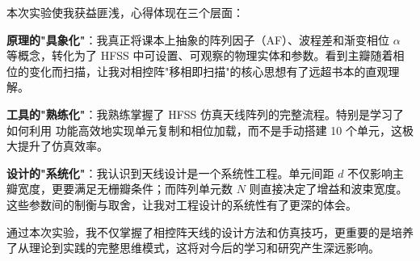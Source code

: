 \documentclass[12pt,a4paper,UTF8]{article}
\begin{document}
本次实验使我获益匪浅，心得体现在三个层面：

\textbf{原理的"具象化"}：我真正将课本上抽象的阵列因子（AF）、波程差和渐变相位 $\alpha$ 等概念，转化为了 HFSS 中可设置、可观察的物理实体和参数。看到主瓣随着相位的变化而扫描，让我对相控阵"移相即扫描"的核心思想有了远超书本的直观理解。

\textbf{工具的"熟练化"}：我熟练掌握了 HFSS 仿真天线阵列的完整流程。特别是学习了如何利用  功能高效地实现单元复制和相位加载，而不是手动搭建 10 个单元，这极大提升了仿真效率。

\textbf{设计的"系统化"}：我认识到天线设计是一个系统性工程。单元间距 $d$ 不仅影响主瓣宽度，更要满足无栅瓣条件；而阵列单元数 $N$ 则直接决定了增益和波束宽度。这些参数间的制衡与取舍，让我对工程设计的系统性有了更深的体会。

通过本次实验，我不仅掌握了相控阵天线的设计方法和仿真技巧，更重要的是培养了从理论到实践的完整思维模式，这将对今后的学习和研究产生深远影响。
\end{document}
